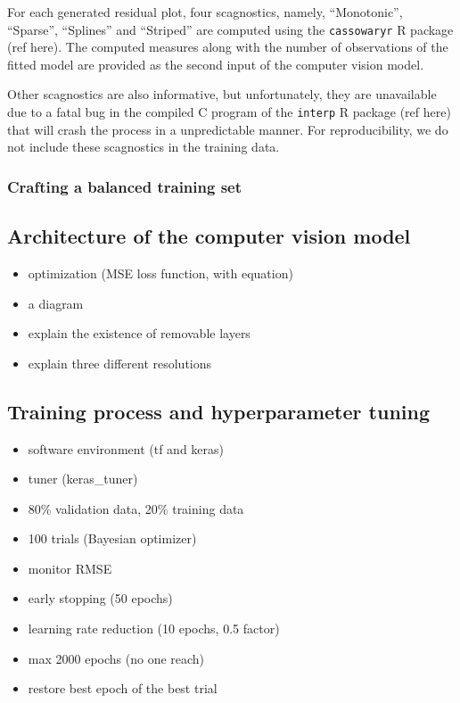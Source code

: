 \documentclass[]{interact}
\theoremstyle{plain}%
\theoremstyle{definition}
\theoremstyle{remark}
\providecommand{\tightlist}{%
  \setlength{\itemsep}{0pt}\setlength{\parskip}{0pt}}
\def\tightlist{}
\begin{document}
For each generated residual plot, four scagnostics, namely,
``Monotonic'', ``Sparse'', ``Splines'' and ``Striped'' are computed
using the \texttt{cassowaryr} R package (ref here). The computed
measures along with the number of observations of the fitted model are
provided as the second input of the computer vision model.

Other scagnostics are also informative, but unfortunately, they are
unavailable due to a fatal bug in the compiled C program of the
\texttt{interp} R package (ref here) that will crash the process in a
unpredictable manner. For reproducibility, we do not include these
scagnostics in the training data.

\hypertarget{crafting-a-balanced-training-set}{%
\subsubsection{Crafting a balanced training
set}\label{crafting-a-balanced-training-set}}

\hypertarget{architecture-of-the-computer-vision-model}{%
\subsection{Architecture of the computer vision
model}\label{architecture-of-the-computer-vision-model}}

\begin{itemize}
\tightlist
\item
  optimization (MSE loss function, with equation)
\item
  a diagram
\item
  explain the existence of removable layers
\item
  explain three different resolutions
\end{itemize}

\hypertarget{training-process-and-hyperparameter-tuning}{%
\subsection{Training process and hyperparameter
tuning}\label{training-process-and-hyperparameter-tuning}}

\begin{itemize}
\tightlist
\item
  software environment (tf and keras)
\item
  tuner (keras\_tuner)
\item
  80\% validation data, 20\% training data
\item
  100 trials (Bayesian optimizer)
\item
  monitor RMSE
\item
  early stopping (50 epochs)
\item
  learning rate reduction (10 epochs, 0.5 factor)
\item
  max 2000 epochs (no one reach)
\item
  restore best epoch of the best trial
\end{itemize}
\end{document}
